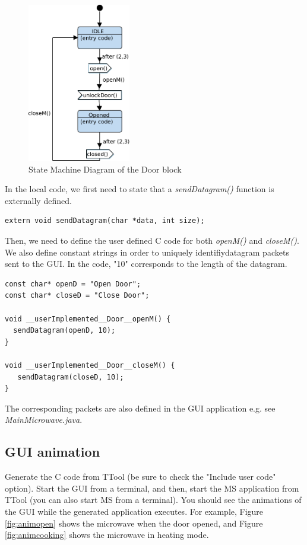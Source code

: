 \documentclass[12pt]{article}
\begin{document}
\begin{figure}[htbp]
\centering
\includegraphics[width=0.4\textwidth]{figures/door}
\caption{State Machine Diagram of the Door block} \label{fig:door}
\end{figure}

In the local code, we first need to state that a \textit{sendDatagram()} function is externally defined.
 \begin{lstlisting}
extern void sendDatagram(char *data, int size);
\end{lstlisting}
Then, we need to define the user defined C code for both \textit{openM()} and \textit{closeM()}.  We also define constant strings in order to uniquely identifiydatagram packets sent to the GUI. In the code, "10" corresponds to the length of the datagram. 

\begin{lstlisting}
const char* openD = "Open Door";
const char* closeD = "Close Door";

void __userImplemented__Door__openM() {
  sendDatagram(openD, 10);
}

void __userImplemented__Door__closeM() {
   sendDatagram(closeD, 10);
}
\end{lstlisting}

The corresponding packets are also defined in the GUI application e.g. see \textit{MainMicrowave.java}. 

\subsection{GUI animation}
Generate the C code from TTool (be sure to check the "Include user code" option). Start the GUI from a terminal, and then, start the MS application from TTool (you can also start MS from a terminal). You should see the animations of the GUI while the generated application executes. For example, Figure \ref{fig:animopen} shows the microwave when the door opened, and Figure \ref{fig:animcooking} shows the microwave in heating mode.
\end{document}
